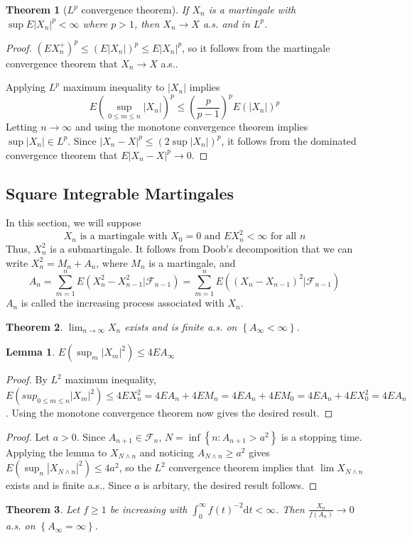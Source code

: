 \documentclass{article}
\newtheorem{Thm}{Theorem}[section]
\newtheorem{Lem}{Lemma}[section]
\theoremstyle{definition}
\begin{document}
\begin{Thm}[$L^p$ convergence theorem]
If $X_n$ is a martingale with $\sup E\left|X_n\right|^p<\infty$ where $p>1$, then $X_n\to X$ a.s. and in $L^p$.
\end{Thm}
\begin{proof}
$(EX_n^+)^p\le (E\left|X_n\right|)^p\le E\left|X_n\right|^p$, so it follows from the martingale convergence theorem that $X_n\to X$ a.s..\par
Applying $L^p$ maximum inequality to $\left|X_n\right|$ implies \[E(\sup_{0\le m\le n}\left|X_n\right|)^p\le (\frac{p}{p-1})^pE(\left|X_n\right|)^p\]
Letting $n\to\infty$ and using the monotone convergence theorem implies $\sup\left|X_n\right|\in L^p$. Since $\left|X_n-X\right|^p\le (2\sup\left|X_n\right|)^p$, it follows from the dominated convergence theorem that $E\left|X_n-X\right|^p\to 0$.
\end{proof}

\subsection{Square Integrable Martingales}
In this section, we will suppose \[X_n \text{ is a martingale with }X_0=0 \text{ and } EX_n^2<\infty \text{ for all } n\]
Thus, $X_n^2$ is a submartingale. It follows from Doob's decomposition that we can write $X_n^2=M_n+A_n$, where $M_n$ is a martingale, and \[A_n=\sum_{m=1}^nE(X_n^2-X_{n-1}^2|\mathcal{F}_{n-1})=\sum_{m=1}^nE((X_n-X_{n-1})^2|\mathcal{F}_{n-1})\]
$A_n$ is called the increasing process associated with $X_n$.
\begin{Thm}
$\lim_{n\to\infty}X_n$ exists and is finite a.s. on $\left\{A_\infty<\infty\right\}$.
\end{Thm}
\begin{Lem}
$E(\sup_m\left|X_m\right|^2)\le 4EA_\infty$
\end{Lem}
\begin{proof}
By $L^2$ maximum inequality, $E(sup_{0\le m\le n}\left|X_m\right|^2)\le 4EX_n^2=4EA_n+4EM_n=4EA_n+4EM_0=4EA_n+4EX_0^2=4EA_n$. Using the monotone convergence theorem now gives the desired result.
\end{proof}
\begin{proof}
Let $a>0$. Since $A_{n+1}\in \mathcal{F}_n$, $N=\inf\left\{n:A_{n+1}>a^2\right\}$ is a stopping time. Applying the lemma to $X_{N\wedge n}$ and noticing $A_{N\wedge n}\ge a^2$ gives $E(\sup_n\left|X_{N\wedge n}\right|^2)\le 4a^2$, so the $L^2$ convergence theorem implies that $\lim X_{N\wedge n}$ exists and is finite a.s.. Since $a$ is arbitary, the desired result follows.
\end{proof}
\begin{Thm}
Let $f\ge 1$ be increasing with $\int_0^\infty f(t)^{-2}\mathrm{d}t<\infty$. Then $\frac{X_n}{f(A_n)}\to 0$ a.s. on $\left\{A_\infty=\infty\right\}$.
\end{Thm}
\end{document}
